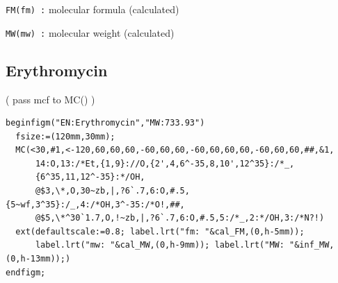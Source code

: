\documentclass{article}
\begin{document}
{{\tt FM(fm) :} molecular formula (calculated) \\
{{\tt MW(mw) :} molecular weight (calculated)
\subsection{Erythromycin}
\noindent%
( pass mcf to MC() )
\begin{verbatim}
beginfigm("EN:Erythromycin","MW:733.93")
  fsize:=(120mm,30mm);
  MC(<30,#1,<-120,60,60,60,-60,60,60,-60,60,60,60,-60,60,60,##,&1,
      14:O,13:/*Et,{1,9}://O,{2',4,6^-35,8,10',12^35}:/*_,
      {6^35,11,12^-35}:*/OH,
      @$3,\*,O,30~zb,|,?6`.7,6:O,#.5,{5~wf,3^35}:/_,4:/*OH,3^-35:/*O!,##,
      @$5,\*^30`1.7,O,!~zb,|,?6`.7,6:O,#.5,5:/*_,2:*/OH,3:/*N?!)
  ext(defaultscale:=0.8; label.lrt("fm: "&cal_FM,(0,h-5mm));
      label.lrt("mw: "&cal_MW,(0,h-9mm)); label.lrt("MW: "&inf_MW,(0,h-13mm));)
endfigm;
\end{verbatim}
}}
\end{document}
